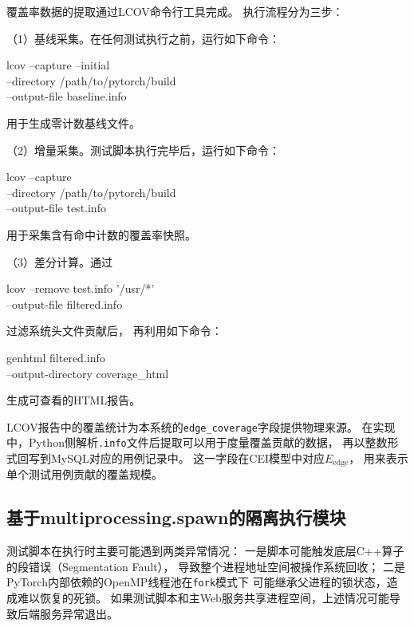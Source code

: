 覆盖率数据的提取通过LCOV命令行工具完成。
执行流程分为三步：

（1）基线采集。在任何测试执行之前，运行如下命令：
\begin{flushleft}
\small\ttfamily
lcov --capture --initial\\
\hspace*{1em}--directory /path/to/pytorch/build\\
\hspace*{1em}--output-file baseline.info
\end{flushleft}
用于生成零计数基线文件。

（2）增量采集。测试脚本执行完毕后，运行如下命令：
\begin{flushleft}
\small\ttfamily
lcov --capture\\
\hspace*{1em}--directory /path/to/pytorch/build\\
\hspace*{1em}--output-file test.info
\end{flushleft}
用于采集含有命中计数的覆盖率快照。

（3）差分计算。通过
\begin{flushleft}
\small\ttfamily
lcov --remove test.info '/usr/*'\\
\hspace*{1em}--output-file filtered.info
\end{flushleft}
过滤系统头文件贡献后，
再利用如下命令：
\begin{flushleft}
\small\ttfamily
genhtml filtered.info\\
\hspace*{1em}--output-directory coverage\_html
\end{flushleft}
生成可查看的HTML报告。

LCOV报告中的覆盖统计为本系统的\texttt{edge\_coverage}字段提供物理来源。
在实现中，Python侧解析\texttt{.info}文件后提取可以用于度量覆盖贡献的数据，
再以整数形式回写到MySQL对应的用例记录中。
这一字段在CEI模型中对应$E_{\text{edge}}$，
用来表示单个测试用例贡献的覆盖规模。

\subsection{基于multiprocessing.spawn的隔离执行模块}

测试脚本在执行时主要可能遇到两类异常情况：
一是脚本可能触发底层C++算子的段错误（Segmentation Fault），
导致整个进程地址空间被操作系统回收；
二是PyTorch内部依赖的OpenMP线程池在\texttt{fork}模式下
可能继承父进程的锁状态，造成难以恢复的死锁。
如果测试脚本和主Web服务共享进程空间，上述情况可能导致后端服务异常退出。

